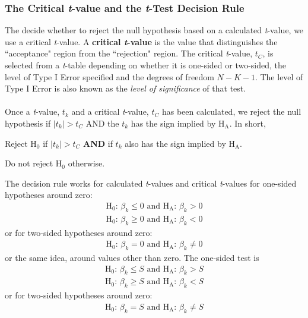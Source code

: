 \documentclass[11pt]{article}
\begin{document}
\subsubsection{The Critical \textit{t}-value and the \textit{t}-Test Decision Rule}
The decide whether to reject the null hypothesis based on a calculated \textit{t}-value, we use a critical \textit{t}-value. A \textbf{critical \textit{t}-value} is the value that distinguishes the ``acceptance" region from the ``rejection" region. The critical \textit{t}-value, $t_C$, is selected from a \textit{t}-table depending on whether it is one-sided or two-sided, the level of Type I Error specified and the degrees of freedom $N-K-1$. The level of Type I Error is also known as the \textit{level of significance} of that test.\\ \\
Once a \textit{t}-value, $t_k$ and a critical \textit{t}-value, $t_C$ has been calculated, we reject the null hypothesis if $|t_k| > t_C$ AND the $t_k$ has the sign implied by H$_\text{A}$. In short,
\begin{framed}Reject H$_0$ if  $|t_k| > t_C$ \textbf{AND} if $t_k$ also has the sign implied by H$_\text{A}$.
\par Do not reject H$_0$ otherwise.
\end{framed}
The decision rule works for calculated \textit{t}-values and critical \textit{t}-values for one-sided hypotheses around zero:
\begin{align*}
 \text{H}_0\text{: }\beta_k \leq 0 \text{ and } \text{H}_\text{A}\text{: } \beta_k > 0\\
 \text{H}_0\text{: }\beta_k \geq 0 \text{ and } \text{H}_\text{A}\text{: } \beta_k < 0
\end{align*}
or for two-sided hypotheses around zero:
\begin{align*}
 \text{H}_0\text{: }\beta_k = 0 \text{ and } \text{H}_\text{A}\text{: } \beta_k \neq 0
\end{align*}
or the same idea, around values other than zero. The one-sided test is
\begin{align*}
 \text{H}_0\text{: }\beta_k \leq S \text{ and } \text{H}_\text{A}\text{: } \beta_k > S\\
 \text{H}_0\text{: }\beta_k \geq S \text{ and } \text{H}_\text{A}\text{: } \beta_k < S
\end{align*}
or for two-sided hypotheses around zero:
\begin{align*}
 \text{H}_0\text{: }\beta_k = S \text{ and } \text{H}_\text{A}\text{: } \beta_k \neq S
\end{align*}
\end{document}
